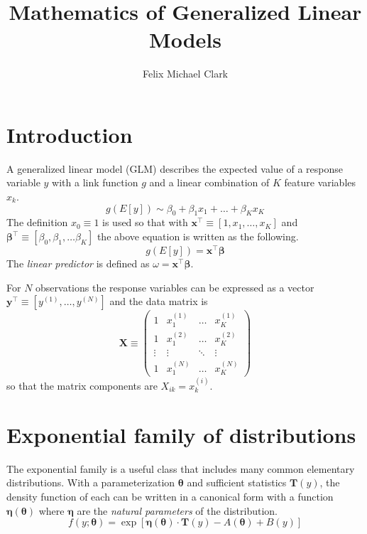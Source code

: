 \documentclass{article}
\title{Mathematics of Generalized Linear Models}
\author{Felix Michael Clark}
\newcommand{\bbeta}{\boldsymbol{\beta}}
\begin{document}
\maketitle
\tableofcontents

\section{Introduction}

A generalized linear model (GLM) describes the expected value of a response
variable \(y\) with a link function \(g\) and a linear combination of \(K\) feature
variables \(x_k\).
\[ g(E[y]) \sim \beta_0 + \beta_1 x_1 + \ldots + \beta_K x_K \]
The definition \(x_0 \equiv 1\) is used so that with \(\mathbf{x}^\intercal \equiv [1, x_1,
	\ldots, x_K]\) and \(\bbeta^\intercal \equiv [\beta_0, \beta_1, \ldots
	\beta_K]\) the above equation is written as the following.
\[ g(E[y]) = \mathbf{x}^\intercal \bbeta\]
The \emph{linear predictor} is defined as \(\omega = \mathbf{x}^\intercal
\bbeta \).

For \(N\) observations the response variables can be expressed as a vector
\(\mathbf{y}^\intercal \equiv [y^{(1)}, \ldots, y^{(N)}]\) and the data matrix is
\begin{equation}
	\mathbf{X} \equiv \begin{pmatrix}
		1      & x_1^{(1)} & \ldots & x_K^{(1)} \\
		1      & x_1^{(2)} & \ldots & x_K^{(2)} \\
		\vdots & \vdots    & \ddots & \vdots    \\
		1      & x_1^{(N)} & \ldots & x_K^{(N)}
	\end{pmatrix}
\end{equation}
so that the matrix components are \(X_{ik} = x_{k}^{(i)}\).

\section{Exponential family of distributions}

The exponential family is a useful class that includes many common elementary
distributions. With a parameterization \(\boldsymbol{\theta}\) and sufficient
statistics \(\mathbf{T}(y)\), the density function of each can be written in a
canonical form with a function \(\boldsymbol{\eta}(\boldsymbol{\theta})\) where
\(\boldsymbol{\eta}\) are the \emph{natural parameters} of the distribution.
\[ f(y; \boldsymbol{\theta}) = \exp\left[ \boldsymbol{\eta}(\boldsymbol{\theta}) \cdot \mathbf{T}(y) - A(\boldsymbol{\theta}) + B(y) \right] \]
\end{document}
